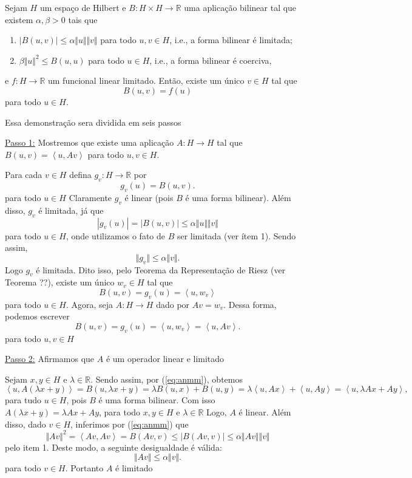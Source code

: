 \documentclass[a4paper, 11pt]{book}
\theoremstyle{definition}
\newcommand{\bR}{\mathbb{R}}
\begin{document}
\begin{tbox}
    Sejam $H$ um espaço de Hilbert e $B : H \times H \to \bR$ uma aplicação bilinear tal que existem $\alpha, \beta > 0$ tais que
    \begin{enumerate}
        \item $| B(u,v)| \leqslant \alpha \Vert u \Vert \Vert v \Vert$ para todo $u,v \in H$, i.e., a forma bilinear é limitada;
        \item $\beta \Vert u \Vert^2 \leqslant B(u,u)$ para todo $u \in H$, i.e., a forma bilinear é coerciva,
    \end{enumerate}
    e $f : H \to \bR$ um funcional linear limitado. Então, existe um único $v \in H$ tal que
    \[
        B(u,v) = f(u)
    \]
    para todo $u \in H$.
\end{tbox}
\begin{prf}
    Essa demonstração sera dividida em seis passos

    \underline{Passo 1:} Mostremos que existe uma aplicação $A : H \to H$ tal que $B(u,v) = \left\langle u, Av \right\rangle$ para todo $u,v \in H$.

    Para cada $v \in H$ defina $g_v : H \to \bR$ por
    \[
        g_v(u) = B(u,v).
    \]
    para todo $u \in H$
    Claramente $g_v$ é linear (pois $B$ é uma forma bilinear).
    Além disso, $g_v$ é limitada, já que
    \[
        |g_v(u)| = |B(u,v)| \leqslant \alpha \Vert u \Vert \Vert v \Vert
    \]
    para todo $u \in H$, onde utilizamos o fato de $B$ ser limitada (ver ítem 1).
    Sendo assim,
    \[
        \Vert g_v \Vert \leqslant \alpha \Vert v \Vert.
    \]
    Logo $g_v$ é limitada.
    Dito isso, pelo Teorema da Representação de Riesz (ver Teorema ??), existe um único $w_v \in H$ tal que
    \[
        B(u,v) = g_v(u) = \left\langle u, w_v \right\rangle
    \]
    para todo $u \in H$.
    Agora, seja $A : H \to H$ dado por $Av = w_v$.
    Dessa forma, podemos escrever
    \begin{equation} \label{eq:anmm}
        B(u,v) = g_v(u) = \left\langle u,w_v \right\rangle = \left\langle u, Av \right\rangle.
    \end{equation}
    para todo $u,v \in H$

    \underline{Passo 2:} Afirmamos que $A$ é um operador linear e limitado

    Sejam $x, y \in H$ e $\lambda \in \bR$.
    Sendo assim, por (\ref{eq:anmm}), obtemos
    \[
        \left\langle u, A(\lambda x + y) \right\rangle = B(u, \lambda x + y) = \lambda B(u,x) + B(u,y) = \lambda \left\langle u, Ax \right\rangle + \left\langle u, Ay \right\rangle = \left\langle u, \lambda Ax + Ay \right\rangle,
    \]
    para tudo $u \in H$,
    pois $B$ é uma forma bilinear.
    Com isso $A(\lambda x + y) = \lambda Ax + Ay$, para todo $x,y \in H$ e $\lambda \in \bR$
    Logo, $A$ é linear.
    Além disso, dado $v \in H$, inferimos por (\ref{eq:anmm}) que
    \[
        \Vert Av \Vert^2 = \left\langle Av, Av \right\rangle = B(Av, v) \leqslant |B(Av, v)| \leqslant \alpha \Vert Av \Vert \Vert v \Vert
    \]
    pelo item 1. Deste modo, a seguinte desigualdade é válida:
    \[
        \Vert Av \Vert \leqslant \alpha \Vert v \Vert.
    \]
    para todo $v \in H$.
    Portanto $A$ é limitado


\end{prf}
\end{document}
